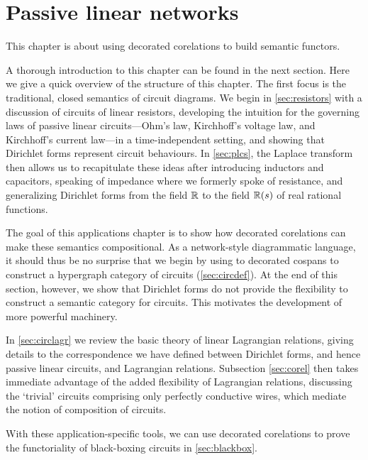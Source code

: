 \chapter{Passive linear networks} \label{ch.circuits}
This chapter is about using decorated corelations to build semantic functors.

A thorough introduction to this chapter can be found in the next section. Here
we give a quick overview of the structure of this chapter. The first focus is
the traditional, closed semantics of circuit diagrams. We begin in
\textsection\ref{sec:resistors} with a discussion of circuits of linear
resistors, developing the intuition for the governing laws of passive linear
circuits---Ohm's law, Kirchhoff's voltage law, and Kirchhoff's current law---in
a time-independent setting, and showing that Dirichlet forms represent circuit
behaviours.  In \textsection\ref{sec:plcs}, the Laplace transform then allows us
to recapitulate these ideas after introducing inductors and capacitors, speaking
of impedance where we formerly spoke of resistance, and generalizing Dirichlet
forms from the field ${\mathbb{R}}$ to the field ${\mathbb{R}}(s)$ of real rational functions. 

The goal of this applications chapter is to show how decorated corelations can
make these semantics compositional. As a network-style diagrammatic language, it
should thus be no surprise that we begin by using to decorated cospans to
construct a hypergraph category of circuits (\textsection\ref{sec:circdef}). At
the end of this section, however, we show that Dirichlet forms do not provide
the flexibility to construct a semantic category for circuits.  This
motivates the development of more powerful machinery.

In \textsection\ref{sec:circlagr} we review the basic theory of linear
Lagrangian relations, giving details to the correspondence we have defined
between Dirichlet forms, and hence passive linear circuits, and Lagrangian
relations. Subsection \ref{sec:corel} then takes immediate advantage of the
added flexibility of Lagrangian relations, discussing the `trivial' circuits
comprising only perfectly conductive wires, which mediate the notion of
composition of circuits.

With these application-specific tools, we can use decorated corelations to prove
the functoriality of black-boxing circuits in \textsection\ref{sec:blackbox}.

